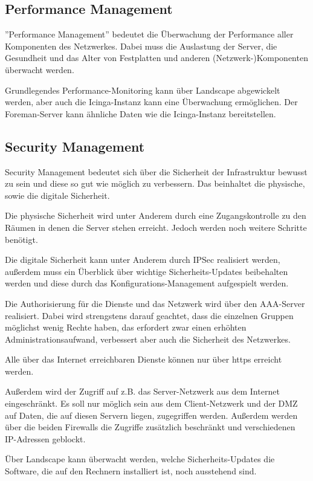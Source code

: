 \subsection{Performance Management}
''Performance Management'' bedeutet die Überwachung der Performance aller Komponenten des Netzwerkes. Dabei muss die Auslastung der Server, die Gesundheit und das Alter von Festplatten und anderen (Netzwerk-)Komponenten überwacht werden.

Grundlegendes Performance-Monitoring kann über Landscape abgewickelt werden, aber auch die Icinga-Instanz kann eine Überwachung ermöglichen. 
Der Foreman-Server kann ähnliche Daten wie die Icinga-Instanz bereitstellen.

\newpage
\subsection{Security Management}
Security Management bedeutet sich über die Sicherheit der Infrastruktur bewusst zu sein und diese so gut wie möglich zu verbessern. Das beinhaltet die physische, sowie die digitale Sicherheit.

Die physische Sicherheit wird unter Anderem durch eine Zugangskontrolle zu den Räumen in denen die Server stehen erreicht. Jedoch werden noch weitere Schritte benötigt.

Die digitale Sicherheit kann unter Anderem durch IPSec realisiert werden, außerdem muss ein Überblick über wichtige Sicherheits-Updates beibehalten werden und diese durch das Konfigurations-Management aufgespielt werden.

Die Authorisierung für die Dienste und das Netzwerk wird über den AAA-Server realisiert. Dabei wird strengstens darauf geachtet, dass die einzelnen Gruppen möglichst wenig Rechte haben, das erfordert zwar einen erhöhten Administrationsaufwand, verbessert aber auch die Sicherheit des Netzwerkes.

Alle über das Internet erreichbaren Dienste können nur über https erreicht werden.

Außerdem wird der Zugriff auf z.B. das Server-Netzwerk aus dem Internet eingeschränkt. Es soll nur möglich sein aus dem Client-Netzwerk und der DMZ auf Daten, die auf diesen Servern liegen, zugegriffen werden. Außerdem werden über die beiden Firewalls die Zugriffe zusätzlich beschränkt und verschiedenen IP-Adressen geblockt.

Über Landscape kann überwacht werden, welche Sicherheits-Updates die Software, die auf den Rechnern installiert ist, noch ausstehend sind.
